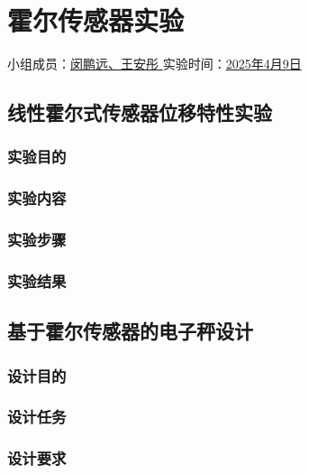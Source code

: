 \section{霍尔传感器实验}

\begin{center}
    {
        小组成员：\underline{\quad 闵鹏远、王安彤 \quad} \quad
        实验时间：\underline{\quad 2025年4月9日 \quad}
    }
\end{center}

\subsection{线性霍尔式传感器位移特性实验}

\subsubsection{实验目的}

\subsubsection{实验内容}

\subsubsection{实验步骤}

\subsubsection{实验结果}

\subsection{基于霍尔传感器的电子秤设计}

\subsubsection{设计目的}

\subsubsection{设计任务}

\subsubsection{设计要求}

